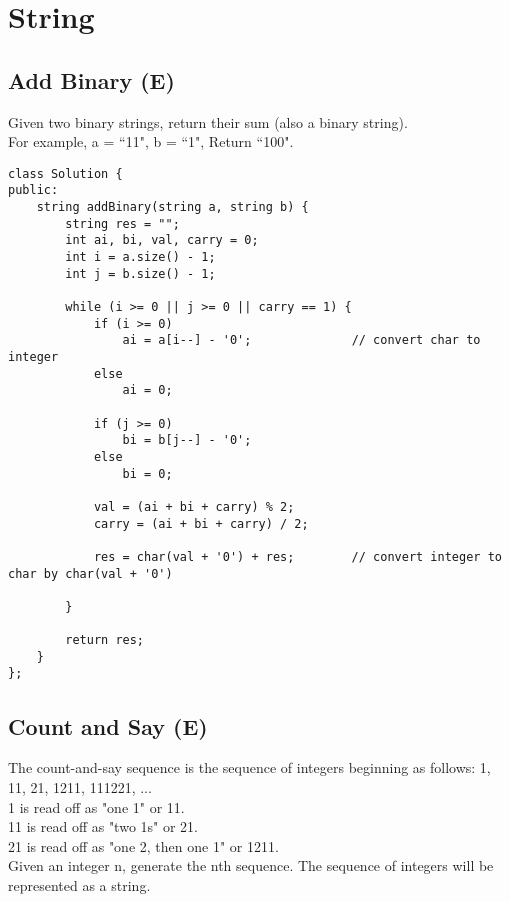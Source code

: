 \chapter{String}


\section{Add Binary (E)}
Given two binary strings, return their sum (also a binary string). \\

For example, a = ``11", b = ``1", Return ``100". \\ 

\begin{lstlisting}
class Solution {
public:
    string addBinary(string a, string b) {
        string res = "";
        int ai, bi, val, carry = 0;
        int i = a.size() - 1;
        int j = b.size() - 1;
        
        while (i >= 0 || j >= 0 || carry == 1) {
            if (i >= 0)
                ai = a[i--] - '0';              // convert char to integer
            else
                ai = 0;
                
            if (j >= 0)
                bi = b[j--] - '0';
            else
                bi = 0;
                
            val = (ai + bi + carry) % 2;
            carry = (ai + bi + carry) / 2;
            
            res = char(val + '0') + res;        // convert integer to char by char(val + '0') 
            
        }
        
        return res;
    }
};
\end{lstlisting}


\section{Count and Say (E)}
The count-and-say sequence is the sequence of integers beginning as follows: 1, 11, 21, 1211, 111221, ...\\
1 is read off as "one 1" or 11.\\
11 is read off as "two 1s" or 21.\\
21 is read off as "one 2, then one 1" or 1211.\\

Given an integer n, generate the nth sequence. The sequence of integers will be represented as a string. \\

